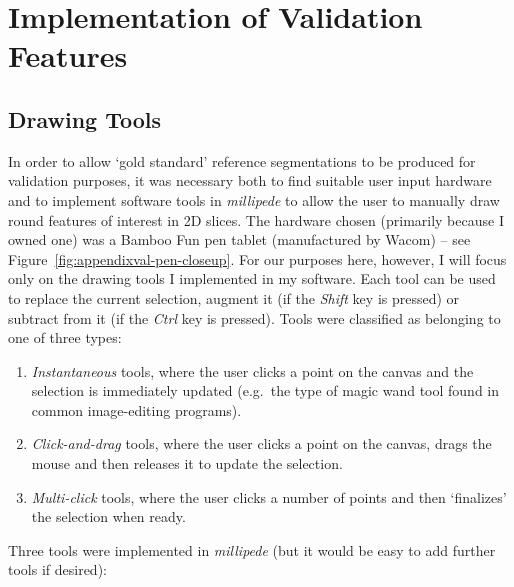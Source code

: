 \chapter{Implementation of Validation Features}
\label{chap:appendixval}

\section{Drawing Tools}


\noindent In order to allow `gold standard' reference segmentations to be produced for validation purposes, it was necessary both to find suitable user input hardware and to implement software tools in \emph{millipede} to allow the user to manually draw round features of interest in 2D slices. The hardware chosen (primarily because I owned one) was a Bamboo Fun pen tablet (manufactured by Wacom) -- see Figure~\ref{fig:appendixval-pen-closeup}. For our purposes here, however, I will focus only on the drawing tools I implemented in my software. Each tool can be used to replace the current selection, augment it (if the \emph{Shift} key is pressed) or subtract from it (if the \emph{Ctrl} key is pressed). Tools were classified as belonging to one of three types:
%
\begin{enumerate}
\item \emph{Instantaneous} tools, where the user clicks a point on the canvas and the selection is immediately updated (e.g.~the type of magic wand tool found in common image-editing programs).
\item \emph{Click-and-drag} tools, where the user clicks a point on the canvas, drags the mouse and then releases it to update the selection.
\item \emph{Multi-click} tools, where the user clicks a number of points and then `finalizes' the selection when ready.
\end{enumerate}

\noindent Three tools were implemented in \emph{millipede} (but it would be easy to add further tools if desired):

